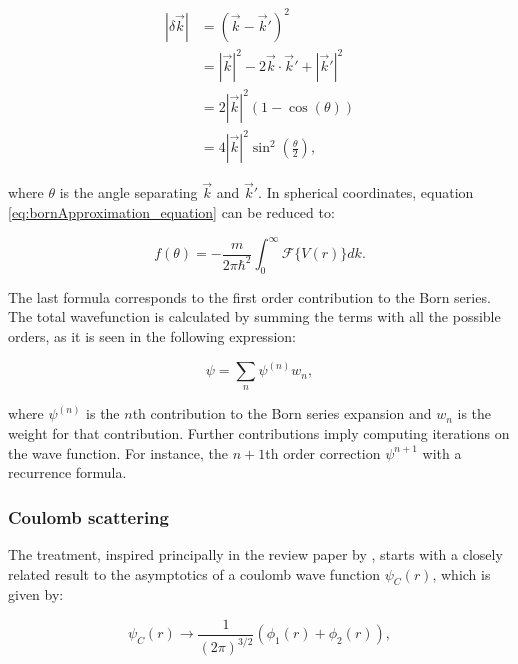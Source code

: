 \documentclass[openany]{book}
\begin{document}
\begin{equation} \label{eq:bornApproximation_waveNumber_difference}
	\begin{split}
	|\delta \vec k| &= (\vec k - \vec k')^2 \\
						   &= |\vec k|^2 - 2 \vec k \cdot  \vec k' + |\vec k'|^2 \\
						   &= 2|\vec k|^2(1 - \cos {(\theta)}) \\
						   &= 4 |\vec k|^2 \sin^2{\left(\frac{\theta}{2}\right)},
	\end{split}
\end{equation}

where $\theta$ is the angle separating $\vec k$ and $\vec k'$. In spherical coordinates, equation \ref{eq:bornApproximation_equation} can be reduced to:

\begin{equation} \label{eq:bornApproximation_scatteringAmplitude}
	f(\theta) =   - \frac{m}{2\pi\hbar^2} \int_{0}^{\infty} {\mathcal{F}\{V(r)\}dk}.
\end{equation}

The last formula corresponds to the first order contribution to the Born series. The total wavefunction is calculated by summing the terms with all the possible orders, as it is seen in the following expression: 

\begin{equation} \label{eq:bornApproximation_series}
	\psi = \sum_n{\psi^{(n)}w_n},
\end{equation}

where $\psi^{(n)}$ is the $n$th contribution to the Born series expansion and $w_n$ is the weight for that contribution. Further contributions imply computing iterations on the wave function. For instance, the $n+1$th order correction $\psi^{n+1}$ with a recurrence formula.


\subsubsection{Coulomb scattering}\label{ssub:scattering_coulomb}

The treatment, inspired principally in the review paper by \cite{descouvemont_baye_2010}, starts with a closely related result to the asymptotics of a coulomb wave function $\psi_C(r)$, which is given by:

\begin{equation}\label{rmatrix_coulombPsi_asymptotics}
	\psi_C(r) \rightarrow \frac{1}{(2\pi)^{3/2}} \left(\phi_1(r) + \phi_2(r)\right),
\end{equation}
\end{document}
